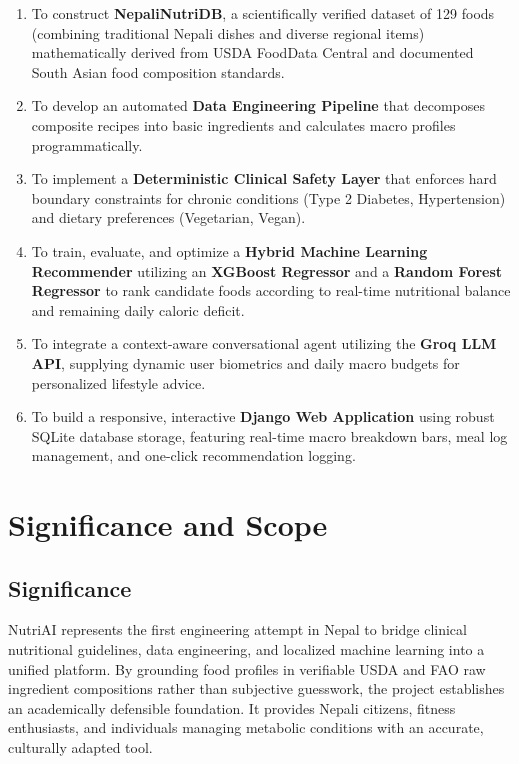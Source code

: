 \documentclass[12pt,a4paper]{report}
\begin{document}
\begin{enumerate}[leftmargin=*]
  \item To construct \textbf{NepaliNutriDB}, a scientifically verified dataset of 129 foods (combining traditional Nepali dishes and diverse regional items) mathematically derived from USDA FoodData Central and documented South Asian food composition standards.
  \item To develop an automated \textbf{Data Engineering Pipeline} that decomposes composite recipes into basic ingredients and calculates macro profiles programmatically.
  \item To implement a \textbf{Deterministic Clinical Safety Layer} that enforces hard boundary constraints for chronic conditions (Type 2 Diabetes, Hypertension) and dietary preferences (Vegetarian, Vegan).
  \item To train, evaluate, and optimize a \textbf{Hybrid Machine Learning Recommender} utilizing an \textbf{XGBoost Regressor} and a \textbf{Random Forest Regressor} to rank candidate foods according to real-time nutritional balance and remaining daily caloric deficit.
  \item To integrate a context-aware conversational agent utilizing the \textbf{Groq LLM API}, supplying dynamic user biometrics and daily macro budgets for personalized lifestyle advice.
  \item To build a responsive, interactive \textbf{Django Web Application} using robust SQLite database storage, featuring real-time macro breakdown bars, meal log management, and one-click recommendation logging.
\end{enumerate}

\section{Significance and Scope}

\subsection{Significance}
NutriAI represents the first engineering attempt in Nepal to bridge clinical nutritional guidelines, data engineering, and localized machine learning into a unified platform. By grounding food profiles in verifiable USDA and FAO raw ingredient compositions rather than subjective guesswork, the project establishes an academically defensible foundation. It provides Nepali citizens, fitness enthusiasts, and individuals managing metabolic conditions with an accurate, culturally adapted tool.
\end{document}
